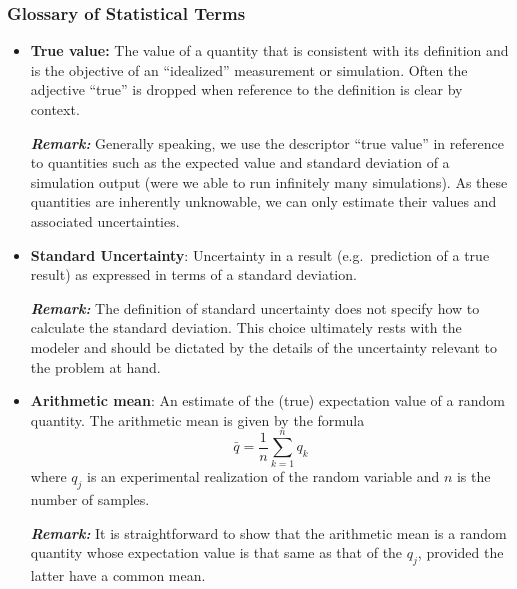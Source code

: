 \subsubsection{Glossary of Statistical Terms}
\begin{itemize}

\item {\bf True value:}  The value of a quantity that is consistent with its definition and is the objective of an ``idealized'' measurement or simulation.
Often the adjective ``true'' is dropped when reference to the definition is clear by context. \cite{JCGM:GUM2008,JCGM:VIM2012}

\medskip

\textbf{\textit{Remark:}} Generally speaking, we use the descriptor ``true value'' in reference to quantities such as the expected value and standard deviation of a simulation output (were we able to run infinitely many simulations).
As these quantities are inherently unknowable, we can only estimate their values and associated uncertainties.


\item {\bf Standard Uncertainty}: Uncertainty in a result (e.g.\ prediction of a true result) as expressed in terms of a standard deviation.

\medskip 

\textbf{\textit{Remark:}} The definition of standard uncertainty does not specify how to calculate the standard deviation.
This choice ultimately rests with the modeler and should be dictated by the details of the uncertainty relevant to the problem at hand.  

\item {\bf Arithmetic mean}: An estimate of the (true) expectation value of a random quantity. The arithmetic mean is given by the formula
  \begin{equation}
    \bar{q} = \dfrac{1}{n} \sum_{k=1}^{n} q_k \label{def:arith_mean}
  \end{equation}
  where $q_j$ is an experimental realization of the random variable and $n$ is the number of samples. 

\medskip 

\textbf{\textit{Remark:}} It is straightforward to show that the arithmetic mean is a random quantity whose expectation value is that same as that of the $q_j$, provided the latter have a common mean.


\end{itemize}
